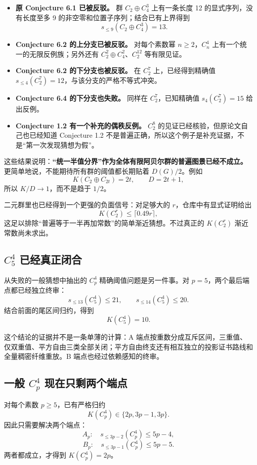\documentclass[11pt,a4paper]{ctexart}
\begin{document}
\begin{itemize}
\item \textbf{原 Conjecture 6.1 已被反驳。} 群 $C_2\oplus C_4^3$ 上有一条长度 12 的显式序列，没有长度至多 9 的非空零和位置子序列；结合已有上界得到
\[
s_{\le 9}(C_2\oplus C_4^3)=13.
\]
\item \textbf{Conjecture 6.2 的上分支已被反驳。} 对每个素数幂 $n\ge2$，$C_n^4$ 上有一个统一的无限反例族；另外还有 $C_2^2\oplus C_4^2$、$C_2^{12}$ 等有限见证。
\item \textbf{Conjecture 6.2 的下分支也被反驳。} 在 $C_2^7$ 上，已经得到精确值 $s_{\le4}(C_2^7)=12$，与该分支的严格不等式冲突。
\item \textbf{Conjecture 6.4 的下分支也失败。} 同样在 $C_2^7$，已知精确值 $s_4(C_2^7)=15$ 给出反例。
\item \textbf{Conjecture 1.2 有一个补充的偶秩反例。} $C_2^8$ 的见证已经核验，但原论文自己也已经知道 Conjecture 1.2 不是普遍正确，所以这个例子是补充证据，不是“第一次发现猜想为假”。
\end{itemize}

这些结果说明：\textbf{“统一半值分界”作为全体有限阿贝尔群的普遍图景已经不成立。} 更简单地说，不能期待所有群的阈值都长期贴着 $D(G)/2$。例如
\[
K(C_2\oplus C_{2t})=2t,\qquad D=2t+1,
\]
所以 $K/D\to1$，而不是趋于 $1/2$。

二元群里也已经得到一个更强的负面信号：对足够大的 $r$，仓库中有显式证明给出
\[
K(C_2^r)\le \lceil0.49r\rceil,
\]
这足以排除“普遍等于一半再加常数”的简单渐近猜想。不过真正的 $K(C_2^r)$ 渐近常数尚未求出。

\subsection{$C_5^4$ 已经真正闭合}

从失败的一般猜想中抽出的 $C_p^4$ 精确阈值问题是另一件事。对 $p=5$，两个最后端点都已经独立终审：
\[
s_{\le13}(C_5^4)\le21,
\qquad
s_{\le14}(C_5^4)\le20.
\]
结合前面的尾区间归约，得到
\[
\boxed{K(C_5^4)=10}.
\]

这个结论的证据并不是一条单薄的计算：A 端点按重数分成互斥区间，三重值、仅双重值、平方自由三类全部关闭；平方自由终支还有相互独立的投影证书路线和全量稠密纤维重放。B 端点也经过依赖感知的终审。

\subsection{一般 $C_p^4$ 现在只剩两个端点}

对每个素数 $p\ge5$，已有严格归约
\[
K(C_p^4)\in\{2p,3p-1,3p\}.
\]
因此只需要解决两个端点：
\[
A_p:\quad s_{\le3p-2}(C_p^4)\le5p-4,
\]
\[
B_p:\quad s_{\le3p-1}(C_p^4)\le5p-5.
\]
两者都成立，才得到 $K(C_p^4)=2p$。
\end{document}
